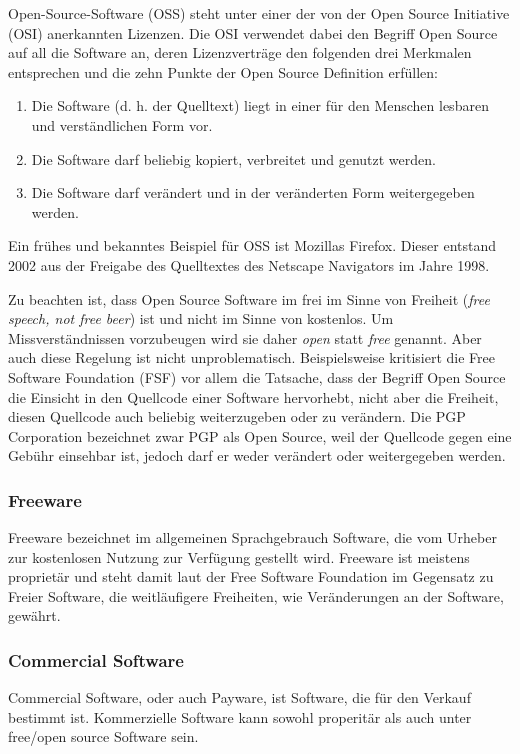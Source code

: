 Open-Source-Software (OSS) steht unter einer der von der Open Source Initiative (OSI) anerkannten Lizenzen. Die OSI verwendet dabei den Begriff Open Source auf all die Software an, deren Lizenzverträge den folgenden drei Merkmalen entsprechen und die zehn Punkte der Open Source Definition erfüllen:
\begin{enumerate}
	\item Die Software (d. h. der Quelltext) liegt in einer für den Menschen lesbaren und verständlichen Form vor.
	\item Die Software darf beliebig kopiert, verbreitet und genutzt werden.
	\item Die Software darf verändert und in der veränderten Form weitergegeben werden.
\end{enumerate}

Ein frühes und bekanntes Beispiel für OSS ist Mozillas Firefox. Dieser entstand 2002 aus der Freigabe des Quelltextes des Netscape Navigators im Jahre 1998.

Zu beachten ist, dass Open Source Software im frei im Sinne von Freiheit ({\it free speech, not free beer}) ist und nicht im Sinne von kostenlos. Um Missverständnissen vorzubeugen wird sie daher {\it open} statt {\it free} genannt. Aber auch diese Regelung ist nicht unproblematisch. Beispielsweise kritisiert die Free Software Foundation (FSF) vor allem die Tatsache, dass der Begriff Open Source die Einsicht in den Quellcode einer Software hervorhebt, nicht aber die Freiheit, diesen Quellcode auch beliebig weiterzugeben oder zu verändern. Die PGP Corporation bezeichnet zwar PGP als Open Source, weil der Quellcode gegen eine Gebühr einsehbar ist, jedoch darf er weder verändert oder weitergegeben werden.

\subsubsection{Freeware}

Freeware bezeichnet im allgemeinen Sprachgebrauch Software, die vom Urheber zur kostenlosen Nutzung zur Verfügung gestellt wird. Freeware ist meistens proprietär und steht damit laut der Free Software Foundation im Gegensatz zu Freier Software, die weitläufigere Freiheiten, wie Veränderungen an der Software, gewährt.

\subsubsection{Commercial Software}
Commercial Software, oder auch Payware, ist Software, die für den Verkauf bestimmt ist. Kommerzielle Software kann sowohl properitär als auch unter free/open source Software sein.

